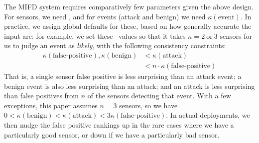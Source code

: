 The MIFD system requires comparatively few \tkappa parameters given the above
design.  For sensors, we need \fpKappa, and for events (attack and benign)
we need $\kappa(\text{event})$.  In practice, we assign global defaults for
these, based on how generally accurate the input \idses are: for example, we set
these \tkappa\ values so that it takes $n = 2\ \text{or}\ 3$ sensors for us to judge an event
as \emph{likely}, with
the following consistency constraints:
\begin{align}
  \label{eqn:coherence-ineq}
  \kappa(\text{false-positive}),\kappa(\text{benign})
  &< \kappa(\text{attack}) \\
 &< n \cdot \kappa(\text{false-positive}) \nonumber
\end{align}
That is, a single sensor false positive is less surprising than an
  attack event;
a benign event is also less surprising than an attack; and
an attack is less surprising than false positives from $n$
  of the sensors detecting that event.
%
With a few exceptions, this paper assumes $n=3$ sensors, so we
have $0 < \kappa(\text{benign}) < \kappa(\text{attack}) 
    < 3 \kappa(\text{false-positive})$.
In actual deployments, we then
nudge the false positive rankings up in the rare cases where we have a
particularly good sensor, or down if we have a particularly bad sensor.


